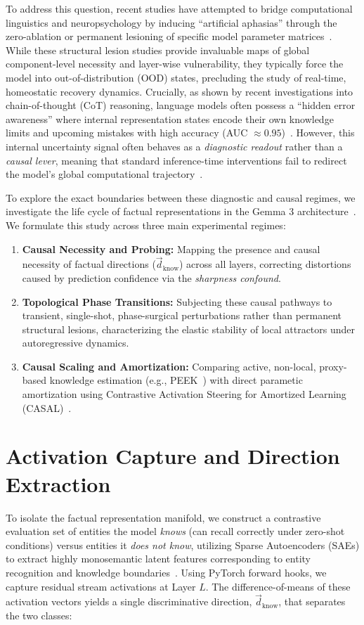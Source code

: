\documentclass[11pt,a4paper,oneside]{memoir}
\begin{document}
To address this question, recent studies have attempted to bridge computational linguistics and neuropsychology by inducing ``artificial aphasias'' through the zero-ablation or permanent lesioning of specific model parameter matrices~\cite{roll2026artificial}. While these structural lesion studies provide invaluable maps of global component-level necessity and layer-wise vulnerability, they typically force the model into out-of-distribution (OOD) states, precluding the study of real-time, homeostatic recovery dynamics. Crucially, as shown by recent investigations into chain-of-thought (CoT) reasoning, language models often possess a ``hidden error awareness'' where internal representation states encode their own knowledge limits and upcoming mistakes with high accuracy (AUC $\approx 0.95$)~\cite{yuan2026hidden}. However, this internal uncertainty signal often behaves as a \textit{diagnostic readout} rather than a \textit{causal lever}, meaning that standard inference-time interventions fail to redirect the model's global computational trajectory~\cite{yuan2026hidden}.

To explore the exact boundaries between these diagnostic and causal regimes, we investigate the life cycle of factual representations in the Gemma 3 architecture~\cite{deepmind2026gemma3}. We formulate this study across three main experimental regimes:
\begin{enumerate}
    \item \textbf{Causal Necessity and Probing:} Mapping the presence and causal necessity of factual directions ($\vec{d}_{\text{know}}$) across all layers, correcting distortions caused by prediction confidence via the \textit{sharpness confound}.
    \item \textbf{Topological Phase Transitions:} Subjecting these causal pathways to transient, single-shot, phase-surgical perturbations rather than permanent structural lesions, characterizing the elastic stability of local attractors under autoregressive dynamics.
    \item \textbf{Causal Scaling and Amortization:} Comparing active, non-local, proxy-based knowledge estimation (e.g., PEEK~\cite{sharma2025efficient}) with direct parametic amortization using Contrastive Activation Steering for Amortized Learning (CASAL)~\cite{yang2025hallucination}.
\end{enumerate}

\chapter{Activation Capture and Direction Extraction}
\label{sec:activation_capture}
To isolate the factual representation manifold, we construct a contrastive evaluation set of entities the model \textit{knows} (can recall correctly under zero-shot conditions) versus entities it \textit{does not know}, utilizing Sparse Autoencoders (SAEs) to extract highly monosemantic latent features corresponding to entity recognition and knowledge boundaries~\cite{ferrando2025do}. Using PyTorch forward hooks, we capture residual stream activations at Layer $L$. The difference-of-means of these activation vectors yields a single discriminative direction, $\vec{d}_{\text{know}}$, that separates the two classes:
\end{document}
